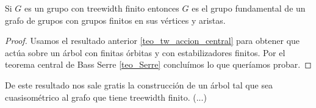\documentclass[tesis.tex]{subfiles}
\begin{document}
\begin{coro}
	Si $G$ es un grupo con treewidth finito entonces $G$ es el grupo fundamental de un grafo de grupos con grupos finitos en sus vértices y aristas.
\end{coro}
\begin{proof}
	Usamos el resultado anterior \ref{teo_tw_accion_central} para obtener que actúa sobre un árbol con finitas órbitas y con estabilizadores finitos.
	Por el teorema central de Bass Serre \ref{teo_Serre} concluímos lo que queríamos probar.
\end{proof}


De este resultado nos sale gratis la construcción de un árbol tal que sea cuasisométrico al grafo que tiene treewidth finito.
(...)
\end{document}
